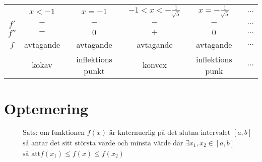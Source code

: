 \begin{center}
\begin{tabular}{ |c|c|c|c|c|c| } 
 \hline
        & $x<-1$    & $x=-1$            & $-1<x<-\frac{1}{\sqrt{5}}$ & $x=-\frac{1}{\sqrt{5}}$ & $\dots$ \\ 
 $f'$   & $-$       & $-$               & $-$                        & $-$                     & $\dots$ \\ 
 $f''$  & $-$       & $0$               & $+$                        & $0$                     & $\dots$ \\
 $f$    & avtagande & avtagande         & avtagande                  & avtagande               & $\dots$ \\
        & kokav     & inflektions punkt & konvex                     & inflektions punk        & $\dots$ \\
 \hline
\end{tabular}
\end{center}


\newpage


\section{Optemering}
\begin{align*}
  &\quad  \text{Sats: om funktionen $f(x)$ är knternuerlig på det slutna intervalet } [a,b] \\
  &\quad  \text{så antar det sitt största värde och minsta värde där } \exists x_1,x_2\in[a,b] \\
  &\quad  \text{så att} f(x_1) \leq f(x) \leq f(x_2)  \\
\end{align*}

